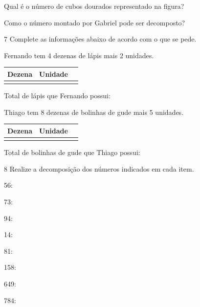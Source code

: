 Qual é o número de cubos dourados representado na figura?


Como o número montado por Gabriel pode ser decomposto?


\num{7} Complete as informações abaixo de acordo com o que se pede. 

\begin{escolha}

\item
  Fernando tem 4 dezenas de lápis mais 2 unidades.

\begin{longtable}[]{@{}lll@{}}
\toprule
Dezena & Unidade\tabularnewline
\midrule
\endhead
&\tabularnewline
\bottomrule
\end{longtable}

Total de lápis que Fernando possui:

\item Thiago tem 8 dezenas de bolinhas de gude mais 5 unidades.

\begin{longtable}[]{@{}lll@{}}
\toprule
Dezena & Unidade\tabularnewline
\midrule
\endhead
&\tabularnewline
\bottomrule
\end{longtable}


Total de bolinhas de gude que Thiago possui:
\end{escolha}

\num{8} Realize a decomposição dos números indicados em cada item.

\begin{escolha}
\item 56: 

\item 73: 

\item 94: 

\item 14: 

\item 81: 

\item 158: 

\item 649: 

\item 784: 
\end{escolha}


